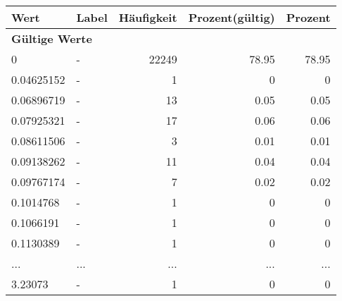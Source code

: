      \begin{longtable}{lXrrr}
     \toprule
     \textbf{Wert} & \textbf{Label} & \textbf{Häufigkeit} & \textbf{Prozent(gültig)} & \textbf{Prozent} \\
     \endhead
     \midrule
     \multicolumn{5}{l}{\textbf{Gültige Werte}}\\
        0 & \multicolumn{1}{X}{-} & %
          \num{22249} &
          \num[round-mode=places,round-precision=2]{78,95} &
          \num[round-mode=places,round-precision=2]{78,95} \\
        0.04625152 & \multicolumn{1}{X}{-} & %
          \num{1} &
          \num[round-mode=places,round-precision=2]{0} &
          \num[round-mode=places,round-precision=2]{0} \\
        0.06896719 & \multicolumn{1}{X}{-} & %
          \num{13} &
          \num[round-mode=places,round-precision=2]{0,05} &
          \num[round-mode=places,round-precision=2]{0,05} \\
        0.07925321 & \multicolumn{1}{X}{-} & %
          \num{17} &
          \num[round-mode=places,round-precision=2]{0,06} &
          \num[round-mode=places,round-precision=2]{0,06} \\
        0.08611506 & \multicolumn{1}{X}{-} & %
          \num{3} &
          \num[round-mode=places,round-precision=2]{0,01} &
          \num[round-mode=places,round-precision=2]{0,01} \\
        0.09138262 & \multicolumn{1}{X}{-} & %
          \num{11} &
          \num[round-mode=places,round-precision=2]{0,04} &
          \num[round-mode=places,round-precision=2]{0,04} \\
        0.09767174 & \multicolumn{1}{X}{-} & %
          \num{7} &
          \num[round-mode=places,round-precision=2]{0,02} &
          \num[round-mode=places,round-precision=2]{0,02} \\
        0.1014768 & \multicolumn{1}{X}{-} & %
          \num{1} &
          \num[round-mode=places,round-precision=2]{0} &
          \num[round-mode=places,round-precision=2]{0} \\
        0.1066191 & \multicolumn{1}{X}{-} & %
          \num{1} &
          \num[round-mode=places,round-precision=2]{0} &
          \num[round-mode=places,round-precision=2]{0} \\
        0.1130389 & \multicolumn{1}{X}{-} & %
          \num{1} &
          \num[round-mode=places,round-precision=2]{0} &
          \num[round-mode=places,round-precision=2]{0} \\
       ... & ... & ... & ... & ... \\
        3.23073 & \multicolumn{1}{X}{-} & %
          \num{1} &
          \num[round-mode=places,round-precision=2]{0} &
          \num[round-mode=places,round-precision=2]{0} \\


\end{longtable}
